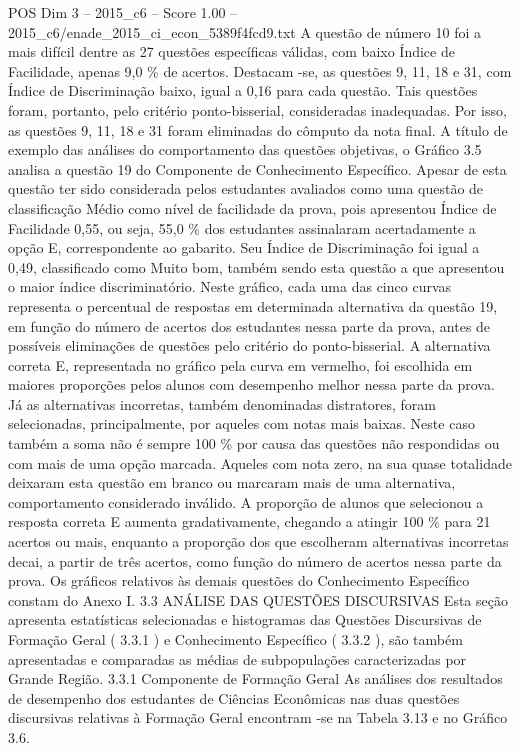 \begin{textsample}{POS Dim 3 – 2015\_c6 – Score 1.00 – 2015\_c6/enade\_2015\_ci\_econ\_5389f4fcd9.txt}
A questão de número 10 foi a mais difícil dentre as 27 questões específicas válidas, com baixo Índice de Facilidade, apenas 9,0 \% de acertos.
Destacam -se, as questões 9, 11, 18 e 31, com Índice de Discriminação baixo, igual a 0,16 para cada questão.
Tais questões foram, portanto, pelo critério ponto-bisserial, consideradas inadequadas.
Por isso, as questões 9, 11, 18 e 31 foram eliminadas do cômputo da nota final.
A título de exemplo das análises do comportamento das questões objetivas, o Gráfico 3.5 analisa a questão 19 do Componente de Conhecimento Específico.
Apesar de esta questão ter sido considerada pelos estudantes avaliados como uma questão de classificação Médio como nível de facilidade da prova, pois apresentou Índice de Facilidade 0,55, ou seja, 55,0 \% dos estudantes assinalaram acertadamente a opção E, correspondente ao gabarito.
Seu Índice de Discriminação foi igual a 0,49, classificado como Muito bom, também sendo esta questão a que apresentou o maior índice discriminatório.
Neste gráfico, cada uma das cinco curvas representa o percentual de respostas em determinada alternativa da questão 19, em função do número de acertos dos estudantes nessa parte da prova, antes de possíveis eliminações de questões pelo critério do ponto-bisserial.
A alternativa correta E, representada no gráfico pela curva em vermelho, foi escolhida em maiores proporções pelos alunos com desempenho melhor nessa parte da prova.
Já as alternativas incorretas, também denominadas distratores, foram selecionadas, principalmente, por aqueles com notas mais baixas.
Neste caso também a soma não é sempre 100 \% por causa das questões não respondidas ou com mais de uma opção marcada.
Aqueles com nota zero, na sua quase totalidade deixaram esta questão em branco ou marcaram mais de uma alternativa, comportamento considerado inválido.
A proporção de alunos que selecionou a resposta correta E aumenta gradativamente, chegando a atingir 100 \% para 21 acertos ou mais, enquanto a proporção dos que escolheram alternativas incorretas decai, a partir de três acertos, como função do número de acertos nessa parte da prova.
Os gráficos relativos às demais questões do Conhecimento Específico constam do Anexo I. 3.3 ANÁLISE DAS QUESTÕES DISCURSIVAS Esta seção apresenta estatísticas selecionadas e histogramas das Questões Discursivas de Formação Geral ( 3.3.1 ) e Conhecimento Específico ( 3.3.2 ), são também apresentadas e comparadas as médias de subpopulações caracterizadas por Grande Região. 3.3.1 Componente de Formação Geral As análises dos resultados de desempenho dos estudantes de Ciências Econômicas nas duas questões discursivas relativas à Formação Geral encontram -se na Tabela 3.13 e no Gráfico 3.6.

\end{textsample}

